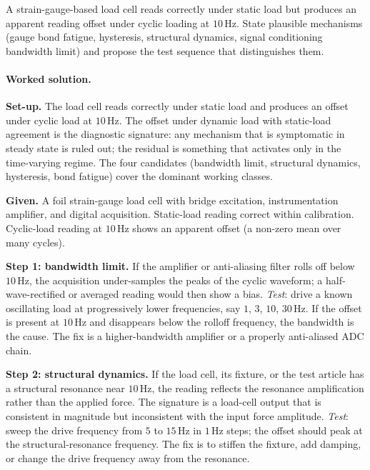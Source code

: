 \begin{exercise}
A strain-gauge-based load cell reads correctly under static load
but produces an apparent reading offset under cyclic loading at
$10 \,\si{\hertz}$. State plausible mechanisms (gauge bond fatigue,
hysteresis, structural dynamics, signal conditioning bandwidth
limit) and propose the test sequence that distinguishes them.
\end{exercise}

\paragraph{Worked solution.}
\textbf{Set-up.} The load cell reads correctly under static load
and produces an offset under cyclic load at $10 \,\si{\hertz}$.
The offset under dynamic load with static-load agreement is the
diagnostic signature: any mechanism that is symptomatic in steady
state is ruled out; the residual is something that activates only
in the time-varying regime. The four candidates (bandwidth limit,
structural dynamics, hysteresis, bond fatigue) cover the dominant
working classes.

\textbf{Given.} A foil strain-gauge load cell with bridge
excitation, instrumentation amplifier, and digital acquisition.
Static-load reading correct within calibration. Cyclic-load
reading at $10 \,\si{\hertz}$ shows an apparent offset (a
non-zero mean over many cycles).

\textbf{Step 1: bandwidth limit.} If the amplifier or
anti-aliasing filter rolls off below $10 \,\si{\hertz}$, the
acquisition under-samples the peaks of the cyclic waveform; a
half-wave-rectified or averaged reading would then show a bias.
\emph{Test}: drive a known oscillating load at progressively
lower frequencies, say $1$, $3$, $10$, $30 \,\si{\hertz}$. If
the offset is present at $10 \,\si{\hertz}$ and disappears
below the rolloff frequency, the bandwidth is the cause. The
fix is a higher-bandwidth amplifier or a properly anti-aliased
ADC chain.

\textbf{Step 2: structural dynamics.} If the load cell, its
fixture, or the test article has a structural resonance near
$10 \,\si{\hertz}$, the reading reflects the resonance
amplification rather than the applied force. The signature is a
load-cell output that is consistent in magnitude but inconsistent
with the input force amplitude.
\emph{Test}: sweep the drive frequency from $5$ to $15 \,\si
{\hertz}$ in $1 \,\si{\hertz}$ steps; the offset should peak at
the structural-resonance frequency. The fix is to stiffen the
fixture, add damping, or change the drive frequency away from
the resonance.

